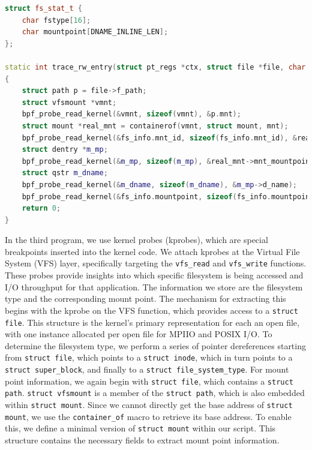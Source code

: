 \documentclass[sigconf]{acmart}
\begin{document}
\begin{lstlisting}[caption={BPF code: take pointer to struct file and move around kernel structs to get desired information.},label={listing:bpf-basic}, name=bpf-basic, float=h, style=mystyle,language=C++]
struct fs_stat_t {
    char fstype[16];
    char mountpoint[DNAME_INLINE_LEN];
};

static int trace_rw_entry(struct pt_regs *ctx, struct file *file, char __user *buf, size_t count)
{
    struct path p = file->f_path;
    struct vfsmount *vmnt;
    bpf_probe_read_kernel(&vmnt, sizeof(vmnt), &p.mnt);
    struct mount *real_mnt = containerof(vmnt, struct mount, mnt);
    bpf_probe_read_kernel(&fs_info.mnt_id, sizeof(fs_info.mnt_id), &real_mnt->mnt_id);
    struct dentry *m_mp;
    bpf_probe_read_kernel(&m_mp, sizeof(m_mp), &real_mnt->mnt_mountpoint);
    struct qstr m_dname;
    bpf_probe_read_kernel(&m_dname, sizeof(m_dname), &m_mp->d_name);
    bpf_probe_read_kernel(&fs_info.mountpoint, sizeof(fs_info.mountpoint), m_dname.name);
    return 0;
}
\end{lstlisting}
In the third program, we use kernel probes (kprobes), which are special breakpoints inserted into the kernel code. We attach kprobes at the Virtual File System (VFS) layer, specifically targeting the \texttt{vfs\_read} and \texttt{vfs\_write} functions. These probes provide insights into which specific filesystem is being accessed and I/O throughput for that application. The information we store are the filesystem type and the corresponding mount point. The mechanism for extracting this begins with the kprobe on the VFS function, which provides access to a \texttt{struct file}. This structure is the kernel’s primary representation for each an open file, with one instance allocated per open file for MPIIO and POSIX I/O. To determine the filesystem type, we perform a series of pointer dereferences starting from \texttt{struct file}, which points to a \texttt{struct inode}, which in turn points to a \texttt{struct super\_block}, and finally to a \texttt{struct file\_system\_type}. For mount point information, we again begin with \texttt{struct file}, which contains a \texttt{struct path}. \texttt{struct vfsmount} is a member of the \texttt{struct path}, which is also embedded within \texttt{struct mount}. Since we cannot directly get the base address of \texttt{struct mount}, we use the \texttt{container\_of} macro to retrieve its base address. To enable this, we define a minimal version of \texttt{struct mount} within our script. This structure contains the necessary fields to extract mount point information.
\end{document}
